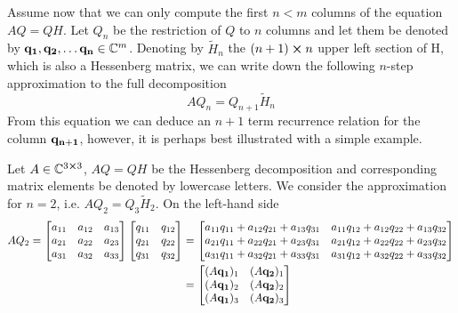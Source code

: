 Assume now that we can only compute the first \(n < m\) columns of the equation \(AQ=QH\).
Let \(Q_n\) be the restriction of \(Q\) to \(n\) columns and let them be denoted by \(\vectorbold{q_1},\vectorbold{q_2}, \ldots
\vectorbold{ q_n}\in \CC^m\).
Denoting by \(\tilde{H}_n\) the \((n+1)\cross n\) upper left section of H, which is also a Hessenberg matrix, we can
write down the following \(n\)-step approximation to the full decomposition
\begin{equation}
	AQ_{n}=Q_{n+1}\tilde{H}_{n}
	\label{eq:krylov_n_approx}
\end{equation}
From this equation we can deduce an \(n+1\) term recurrence relation for the column \(\vectorbold{q_{n+1}}\), however,
it is perhaps best illustrated with a simple example.
\begin{example}
	Let \(A\in \mathbb{C}^{3\cross 3}\), \(AQ=QH\) be the Hessenberg decomposition and corresponding matrix elements
	be denoted by lowercase letters. We consider the approximation for \(n = 2\), i.e. \(AQ_2 = Q_3 \tilde{H}_2\).
	On the left-hand side
	\begin{align*}
		AQ_2 =
		\begin{bmatrix}
			a_{11} & a_{12} & a_{13} \\
			a_{21} & a_{22} & a_{23} \\
			a_{31} & a_{32} & a_{33}
		\end{bmatrix}
		\begin{bmatrix}
			q_{11} & q_{12} \\
			q_{21} & q_{22} \\
			q_{31} & q_{32}
		\end{bmatrix}
		 & =
		\begin{bmatrix}
			a_{11}q_{11} + a_{12}q_{21} + a_{13}q_{31} & a_{11}q_{12} + a_{12}q_{22} + a_{13}q_{32} \\
			a_{21}q_{11} + a_{22}q_{21} + a_{23}q_{31} & a_{21}q_{12} + a_{22}q_{22} + a_{23}q_{32} \\
			a_{31}q_{11} + a_{32}q_{21} + a_{33}q_{31} & a_{31}q_{12} + a_{32}q_{22} + a_{33}q_{32}
		\end{bmatrix} \\
		 & =
		\begin{bmatrix}
			(A\vectorbold{q_1})_1 & (A\vectorbold{q_2})_1 \\
			(A\vectorbold{q_1})_2 & (A\vectorbold{q_2})_2 \\
			(A\vectorbold{q_1})_3 & (A\vectorbold{q_2})_3
		\end{bmatrix}
	\end{align*}

\end{example}
